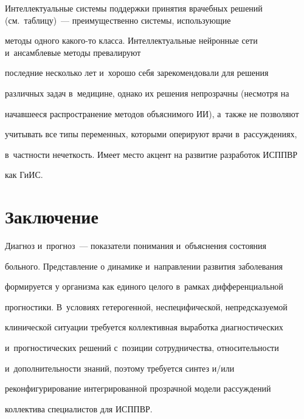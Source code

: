 


  Интеллектуальные системы поддержки принятия врачебных решений (см.\ таблицу)~--- преимущественно сис\-те\-мы, ис\-поль\-зу\-ющие 

методы одного ка\-ко\-го-то класса. Интеллектуальные нейронные сети и~ансамблевые методы превалируют 

последние несколько лет и~хорошо себя зарекомендовали для решения 

различных задач в~медицине, однако их решения непрозрачны (несмотря на 

начавшееся распространение методов объяснимого ИИ), а~также не поз\-во\-ля\-ют 

учитывать все типы переменных, которыми оперируют врачи в~рас\-суж\-де\-ни\-ях, 

в~част\-ности не\-чет\-кость. Имеет место акцент на развитие разработок \mbox{ИСППВР} 

как ГиИС.

{



}

  

\section{Заключение}



  Диагноз и~прогноз~--- показатели понимания и~объяснения состояния 

больного. Представление о динамике и~направлении развития заболевания 

формируется у организма как единого целого в~рамках дифференциальной 

прогностики. В~условиях гетерогенной, неспецифической, непредсказуемой 

\mbox{клинической} ситуации требуется коллективная выработка диагностических 

и~прогностических решений с~позиции сотрудничества, относительности 

и~дополнительности знаний, поэтому требуется синтез и\!/\!или 

реконфигурирование интегрированной прозрачной модели рассуждений 

коллектива специалистов для \mbox{ИСППВР}.

{



}

